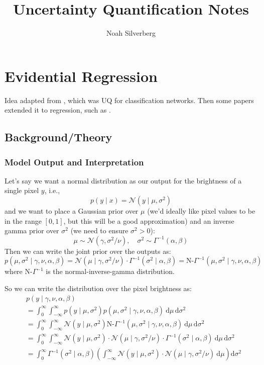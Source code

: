 \documentclass{article}
\title{Uncertainty Quantification Notes}
\author{Noah Silverberg}
\date{}
\newcommand{\0}{\varnothing}
\theoremstyle{definition}
\renewcommand{\d}{\mathrm{d}}
\begin{document}
\maketitle

\section{Evidential Regression}

Idea adapted from \cite{sensoy2018evidentialdeeplearningquantify}, which was UQ for classification networks. Then some papers extended it to regression, such as \cite{amini2020deep}.

\subsection{Background/Theory}

\subsubsection{Model Output and Interpretation}

Let's say we want a normal distribution as our output for the brightness of a single pixel $y$, i.e.,
$$p(y \mid x) = \mathcal{N}(y \mid \mu, \sigma^2)$$
and we want to place a Gaussian prior over $\mu$ (we'd ideally like pixel values to be in the range $[0, 1]$, but this will be a good approximation) and an inverse gamma prior over $\sigma^2$ (we need to ensure $\sigma^2 > 0$):
$$\mu \sim \mathcal{N}(\gamma, \sigma^2/\nu), \quad \sigma^2 \sim \Gamma^{-1}(\alpha, \beta)$$
Then we can write the joint prior over the outputs as:
$$p(\mu, \sigma^2 \mid \gamma, \nu, \alpha, \beta) = \mathcal{N}(\mu \mid \gamma, \sigma^2/\nu) \cdot \Gamma^{-1}(\sigma^2 \mid \alpha, \beta)= \text{N-}\Gamma^{-1}(\mu, \sigma^2 \mid \gamma, \nu, \alpha, \beta)$$
where $\text{N-}\Gamma^{-1}$ is the normal-inverse-gamma distribution.

So we can write the distribution over the pixel brightness as:
\begin{align*}
    &p(y \mid \gamma, \nu, \alpha, \beta) \\
    &= \int_0^\infty \int_{-\infty}^\infty p(y \mid \mu, \sigma^2) p(\mu, \sigma^2 \mid \gamma, \nu, \alpha, \beta)\ \d\mu\,\d\sigma^2 \\
    &= \int_0^\infty \int_{-\infty}^\infty \mathcal{N}(y \mid \mu, \sigma^2) \text{N-}\Gamma^{-1}(\mu, \sigma^2 \mid \gamma, \nu, \alpha, \beta)\ \d\mu\,\d\sigma^2 \\
    &= \int_0^\infty \int_{-\infty}^\infty \mathcal{N}(y \mid \mu, \sigma^2) \cdot \mathcal{N}(\mu \mid \gamma, \sigma^2/\nu) \cdot \Gamma^{-1}(\sigma^2 \mid \alpha, \beta)\ \d\mu\,\d\sigma^2 \\
    &= \int_0^\infty \Gamma^{-1}(\sigma^2 \mid \alpha, \beta) \left( \int_{-\infty}^\infty \mathcal{N}(y \mid \mu, \sigma^2) \cdot \mathcal{N}(\mu \mid \gamma, \sigma^2/\nu)\ \d\mu \right) \d\sigma^2
\end{align*}
\end{document}
